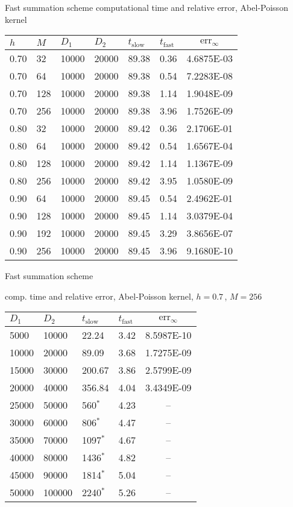 \newpage
\hypertarget{fastsumS2}{}
{\color{blue} Fast summation scheme}
\vfill
computational time and relative error, Abel-Poisson kernel
\vfill
\bc
\begin{tabular}{l|l||l|l|l|l||c}
$h$ & $M$ & $D_1$ & $D_2$ & $t_{\text{slow}}$& $t_{\text{fast}}$ &
$\text{err}_{\infty}$\\\hline
0.70 &  32 &  10000&  20000 & 89.38 &  0.36 & 4.6875E-03\\
0.70 &  64 &  10000&  20000 & 89.38 &  0.54 & 7.2283E-08\\ 
0.70 & 128 &  10000&  20000 & 89.38 &  1.14 & 1.9048E-09\\
0.70 & 256 &  10000&  20000 & 89.38 &  3.96 & 1.7526E-09\\
\hline
0.80 &  32 &  10000&  20000 & 89.42 &  0.36 & 2.1706E-01\\
0.80 &  64 &  10000&  20000 & 89.42 &  0.54 & 1.6567E-04\\
0.80 & 128 &  10000&  20000 & 89.42 &  1.14 & 1.1367E-09\\ 
0.80 & 256 &  10000&  20000 & 89.42 &  3.95 & 1.0580E-09\\
\hline
0.90 &  64 &  10000&  20000 & 89.45 &  0.54 & 2.4962E-01\\
0.90 & 128 &  10000&  20000 & 89.45 &  1.14 & 3.0379E-04\\
0.90 & 192 &  10000&  20000 & 89.45 &  3.29 & 3.8656E-07\\
0.90 & 256 &  10000&  20000 & 89.45 &  3.96 & 9.1680E-10\\
\end{tabular}
\ec
\vfill

\newpage
\hypertarget{fastsumS2}{}
{\color{blue} Fast summation scheme}
\vfill

comp. time and relative error, Abel-Poisson kernel, $h=0.7\, $, $M=256$
\vfill
\bc
\begin{tabular}{l|l||l|l||c}
$D_1$ & $D_2$ & $t_{\text{slow}}$ & $t_{\text{fast}}$  &
$\text{err}_{\infty}$\\\hline
   5000 &  10000 & 22.24 &  3.42 & 8.5987E-10\\
  10000 &  20000 & 89.09 &  3.68 & 1.7275E-09\\
  15000 &  30000 & 200.67 &  3.86 & 2.5799E-09\\
  20000 &  40000 & 356.84 &  4.04 & 3.4349E-09\\
  25000 &  50000 & 560$^*$ &  4.23 & --\\
  30000 &  60000 & 806$^*$ &  4.47 & --\\
  35000 &  70000 & 1097$^*$ &  4.67 & --\\
  40000 &  80000 & 1436$^*$ &  4.82 & --\\
  45000 &  90000 & 1814$^*$ &  5.04 & --\\
  50000 & 100000 & 2240$^*$ &  5.26 & --\\
\end{tabular}
\ec

\vfill

